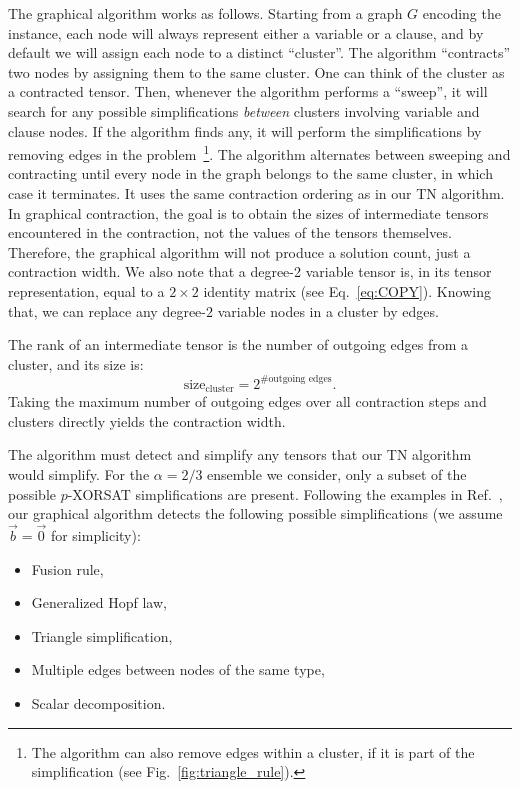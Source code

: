 The graphical algorithm works as follows.
Starting from a graph $G$ encoding the instance, each node will always represent either a variable or a clause, and by default we will assign each node to a distinct ``cluster''.
The algorithm ``contracts'' two nodes by assigning them to the same cluster.
One can think of the cluster as a contracted tensor.
Then, whenever the algorithm performs a ``sweep'', it will search for any possible simplifications \emph{between} clusters involving variable and clause nodes.
If the algorithm finds any, it will perform the simplifications by removing edges in the problem~\footnote{The algorithm can also remove edges within a cluster, if it is part of the simplification (see Fig.~\ref{fig:triangle_rule}).}.
The algorithm alternates between sweeping and contracting until every node in the graph belongs to the same cluster, in which case it terminates.
It uses the same contraction ordering as in our TN algorithm.
In graphical contraction, the goal is to obtain the sizes of intermediate tensors encountered in the contraction, not the values of the tensors themselves.
Therefore, the graphical algorithm will not produce a solution count, just a contraction width.
We also note that a degree-2 variable tensor is, in its tensor representation, equal to a $2 \times 2$ identity matrix (see Eq.~\ref{eq:COPY}).
Knowing that, we can replace any degree-$2$ variable nodes in a cluster by edges.

The rank of an intermediate tensor is the number of outgoing edges from a cluster, and its size is:
\begin{equation} \label{eq:size-cluster}
    \text{size}_{\text{cluster}} = 2^{\text{\#outgoing edges}}.
\end{equation}
Taking the maximum number of outgoing edges over all contraction steps and clusters directly yields the contraction width.

The algorithm must detect and simplify any tensors that our TN algorithm would simplify.
For the $\alpha = 2/3$ ensemble we consider, only a subset of the possible $p$-XORSAT simplifications are present.
Following the examples in Ref.~\cite{denny_algebraically_2012}, our graphical algorithm detects the following possible simplifications (we assume $\vec{b} = \vec{0}$ for simplicity):
\begin{itemize}
    \item Fusion rule,
    \item Generalized Hopf law,
    \item Triangle simplification,
    \item Multiple edges between nodes of the same type,
    \item Scalar decomposition.
\end{itemize}


